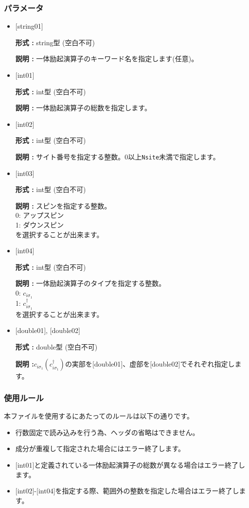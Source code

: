 \subsubsection{パラメータ}
 \begin{itemize}

   \item  $[$string01$]$
   
    {\bf 形式 :} string型 (空白不可)

   {\bf 説明 :} 一体励起演算子のキーワード名を指定します(任意)。

   \item  $[$int01$]$
   
    {\bf 形式 :} int型 (空白不可)

   {\bf 説明 :} 一体励起演算子の総数を指定します。

  \item  $[$int02$]$

 {\bf 形式 :} int型 (空白不可)

{\bf 説明 :} サイト番号を指定する整数。0以上\verb|Nsite|{未満}で指定します。
 
  \item  $[$int03$]$
  
 {\bf 形式 :} int型 (空白不可)

{\bf 説明 :} スピンを指定する整数。\\
0: アップスピン\\
1: ダウンスピン\\
を選択することが出来ます。

\item  $[$int04$]$

 {\bf 形式 :} int型 (空白不可)

{\bf 説明 :} 一体励起演算子のタイプを指定する整数。\\
0: $ c_{i\sigma_1}$\\
1: $ c_{i\sigma_1}^{\dagger}$\\
を選択することが出来ます。

\item  $[$double01$]$, $[$double02$]$

 {\bf 形式 :} double型 (空白不可)

{\bf 説明 :}$c_{i\sigma_1}(c_{i\sigma_1}^{\dag})$の実部を$[$double01$]$、虚部を$[$double02$]$でそれぞれ指定します。

\end{itemize}

\subsubsection{使用ルール}
本ファイルを使用するにあたってのルールは以下の通りです。
\begin{itemize}
\item 行数固定で読み込みを行う為、ヘッダの省略はできません。
\item 成分が重複して指定された場合にはエラー終了します。
\item $[$int01$]$と定義されている一体励起演算子の総数が異なる場合はエラー終了します。
\item $[$int02$]$-$[$int04$]$を指定する際、範囲外の整数を指定した場合はエラー終了します。
\end{itemize}


